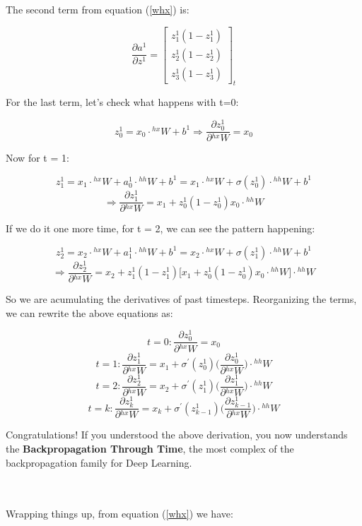 \documentclass[12pt]{article}
\begin{document}
The second term from equation (\ref{whx}) is:

\[
\dfrac{\partial a^{1}}{\partial z^{1}}
=
\begin{bmatrix}
z_{1}^{1}(1 - z_{1}^{1})\\
z_{2}^{1}(1 - z_{2}^{1})\\
z_{3}^{1}(1 - z_{3}^{1})
\end{bmatrix}_{t}
\]

For the last term, let's check what happens with t=0:

\[
z^{1}_{0}
=
x_{0} \cdot {}^{hx}W + b^{1}
\Rightarrow
\dfrac{\partial z^{1}_{0}}{\partial {}^{hx}W}
=
x_{0}
\]

Now for t = 1:

\[
z^{1}_{1}
=
x_{1} \cdot {}^{hx}W + a^{1}_{0} \cdot {}^{hh}W +  b^{1}
=
x_{1} \cdot {}^{hx}W + \sigma(z^{1}_{0}) \cdot {}^{hh}W +  b^{1}
\]
\[
\Rightarrow
\dfrac{\partial z^{1}_{1}}{\partial {}^{hx}W}
=
x_{1} + z^{1}_{0} (1 - z^{1}_{0})x_{0} \cdot {}^{hh}W
\]

If we do it one more time, for t = 2, we can see the pattern happening:


\[
z^{1}_{2}
=
x_{2} \cdot {}^{hx}W + a^{1}_{1} \cdot {}^{hh}W +  b^{1}
=
x_{2} \cdot {}^{hx}W + \sigma(z^{1}_{1}) \cdot {}^{hh}W +  b^{1}
\]
\[
\Rightarrow
\dfrac{\partial z^{1}_{2}}{\partial {}^{hx}W}
=
x_{2} + z^{1}_{1} (1 - z^{1}_{1})\big[ x_{1} + z^{1}_{0} (1 - z^{1}_{0})x_{0} \cdot {}^{hh}W\big] \cdot {}^{hh}W
\]

So we are acumulating the derivatives of past timesteps. Reorganizing the terms, we can rewrite the above equations as:

\[
t = 0: 
\dfrac{\partial z^{1}_{0}}{\partial {}^{hx}W} = x_{0}
\]
\[
t = 1:
\dfrac{\partial z^{1}_{1}}{\partial {}^{hx}W}
=
x_{1} + \sigma^{'}(z^{1}_{0}) \Big (\dfrac{\partial z^{1}_{0}}{\partial {}^{hx}W} \Big )\cdot {}^{hh}W
\]
\[
t = 2:
\dfrac{\partial z^{1}_{2}}{\partial {}^{hx}W}
=
x_{2} + \sigma^{'}(z^{1}_{1}) \Big (\dfrac{\partial z^{1}_{1}}{\partial {}^{hx}W} \Big )\cdot {}^{hh}W
\]
\[
t = k:
\dfrac{\partial z^{1}_{k}}{\partial {}^{hx}W}
=
x_{k} + \sigma^{'}(z^{1}_{k-1}) \Big (\dfrac{\partial z^{1}_{k-1}}{\partial {}^{hx}W} \Big )\cdot {}^{hh}W
\]

Congratulations! If you understood the above derivation, you now understands the \textbf{Backpropagation Through Time}, the most complex of the backpropagation family for Deep Learning.

\mbox{} \\\\
Wrapping things up, from equation (\ref{whx}) we have:
\end{document}
